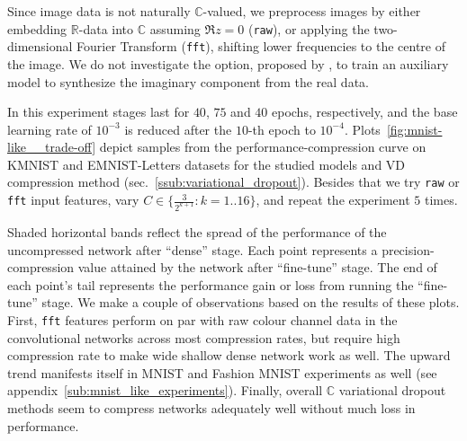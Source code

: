 \documentclass[a4paper,10pt]{article}
\newcommand{\real}{\mathbb{R}}
\newcommand{\cplx}{\mathbb{C}}
\begin{document}
Since image data is not naturally $\cplx$-valued, we preprocess images by either embedding
$\real$-data into $\cplx$ assuming $\Re z = 0$ (\texttt{raw}), or applying the two-dimensional
Fourier Transform (\texttt{fft}), shifting lower frequencies to the centre of the image. We
do not investigate the option, proposed by \citet{trabelsi_deep_2017}, to train an auxiliary
model to synthesize the imaginary component from the real data.

In this experiment stages last for $40$, $75$ and $40$ epochs, respectively, and the base
learning rate of ${10}^{-3}$ is reduced after the $10$-th epoch to ${10}^{-4}$.
%
Plots~\ref{fig:mnist-like__trade-off} depict samples from the performance-compression curve
on KMNIST and EMNIST-Letters datasets for the studied models and VD compression method
(sec.~\ref{ssub:variational_dropout}). Besides that we try \texttt{raw} or \texttt{fft}
input features, vary $
  C \in \{\tfrac3{2^{k+1}}\colon k=1..16\}
$, and repeat the experiment $5$ times.

Shaded horizontal bands reflect the spread of the performance of the uncompressed network
after ``dense'' stage. Each point represents a precision-compression value attained by the
network after ``fine-tune'' stage. The end of each point's tail represents the performance
gain or loss from running the ``fine-tune'' stage.
%
We make a couple of observations based on the results of these plots. First, \texttt{fft}
features perform on par with raw colour channel data in the convolutional networks across most
compression rates, but require high compression rate to make wide shallow dense network work
as well. The upward trend manifests itself in MNIST and Fashion MNIST experiments as well
(see appendix~\ref{sub:mnist_like_experiments}). Finally, overall $\cplx$ variational dropout
methods seem to compress networks adequately well without much loss in performance.
\end{document}
